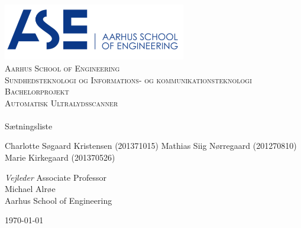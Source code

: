 \begin{titlingpage}
\begin{center}

~ \\[3cm]

\includegraphics[width=0.6\textwidth]{figurer/ASE}~\\[1cm]

\textsc{\LARGE Aarhus School of Engineering}\\[1.5cm]

\textsc{\Large Sundhedsteknologi og Informations- og kommunikationsteknologi}\\

\textsc{\Large Bachelorprojekt}\\[0.5cm]

\textsc{\Large Automatisk Ultralydsscanner} \\[1cm]

\noindent\makebox[\linewidth]{\rule{\textwidth}{0.4pt}}\\
[0.5cm]{\Huge Sætningsliste}
\noindent\makebox[\linewidth]{\rule{\textwidth}{0.4pt}}

\end{center}

Charlotte Søgaard Kristensen (201371015) \newline
Mathias Siig Nørregaard  (201270810)\newline		 
Marie Kirkegaard (201370526) \newline  


\textit{Vejleder} \newline
Associate Professor\\
Michael Alrøe\\
Aarhus School of Engineering


\vfill

\begin{center}
{\large \today}
\end{center}

\end{titlingpage}